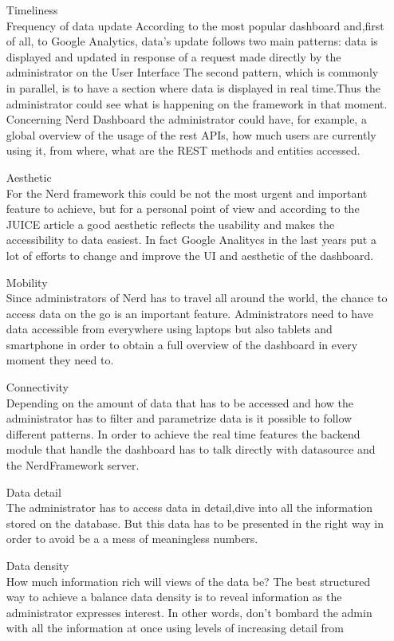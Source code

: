 \documentclass[a4paper,12pt]{report}
\begin{document}
\begin{itemize}
\item[Timeliness] \hfill \\
Frequency of  data update
According to the most popular dashboard and,first of all, to Google Analytics, data's update follows two main patterns: data  is displayed and updated in response of a request made directly by the administrator on the User Interface 
The second pattern, which is commonly in parallel, is to have a section where  data is displayed in real time.Thus the administrator could see what is happening on the framework in that moment. Concerning Nerd Dashboard the administrator could have, for example, a global overview of the usage of the rest APIs, how much users are currently using it, from where, what are the REST methods and entities accessed.
\item[Aesthetic] \hfill \\
For the Nerd framework this could be not the most urgent and important feature to achieve, but for a personal point of view and according to the JUICE article a good aesthetic reflects the usability and makes the accessibility to  data easiest.
In fact Google Analitycs in the last years put a lot of efforts to change and improve the UI and aesthetic of the dashboard.
\item[Mobility] \hfill \\
Since administrators of Nerd has to travel all around the world, the chance to access data on the go is an important feature. Administrators need to have data accessible from everywhere using laptops but also tablets and smartphone in order to obtain a full overview of the dashboard in every moment they need to.
\item[Connectivity] \hfill \\
Depending on the amount of data that has to be accessed and how the administrator has to filter and parametrize data is it possible to follow different patterns. 
In order to achieve the real time features the backend module that handle the dashboard has to talk directly with datasource and the NerdFramework server.
\item[Data detail] \hfill \\
The administrator has to access data in detail,dive into all the information stored on the database. But this data has to be presented in the right way in order to avoid  be a a mess of meaningless numbers.
\item[Data density] \hfill \\
 How much information rich will views of the data be? The best structured way to achieve a balance data density is to reveal information as the administrator expresses interest. In other words, don't bombard the admin with all the information at once using levels of increasing detail from 

\end{itemize}
\end{document}

